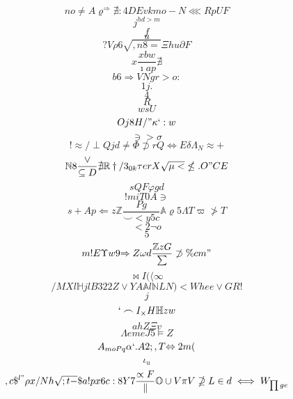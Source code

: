 \documentclass[12pt]{article}
\begin{document}
        \begin{minipage}[t][0pt]{\linewidth}

        \[n o\neq A\varrho^{\Rightarrow}\nexists : 4 D E v k m o - N\lll R p U F\]
\[j^{hd>m}\]
\[f\]
\[u\]
\[?V\rho 6\sqrt{,n8=}\Xi h u\partial F\]
\[x\frac{xbw}{\imath a p}\nexists\]
\[b6\Longrightarrow V N g r > o :\]
\[1j.\]
\[4\]
\[R\]
\[wsU\]
\[Oj8H/"\kappa ` : w\]
\[\ni > {\sigma}\]
\[!\approx /\perp Q j d\neq\Phi\not\supset r Q\iff E\delta\Lambda_{N}\approx +\]
\[\mathbb{N} 8\frac{\lor}{\subseteq D}\nexists\mathbb{R}\dagger / 3_{0k}\tau e r X\sqrt{\mu <}\nleq . O " C E\]
\[sQF\varphi g d\]
\[!miT0A\ni\]
\[s+Ap\Leftarrow z\mathbb{Z}\frac{Pg}{\smile < y 5 c}\mathbb{A}\varrho 5\Lambda T\varpi\ngtr T\]
\[<2\neg o\]
\[5\]
\[m!E\Upsilon w 9 {\Rightarrow Z}\omega d\frac{\mathbb{Z} z G}{\sum}\not\supset\% c m "\]
\[\bowtie I (\langle\infty\]
\[/MXl\mathbb{H} j l B 3 2 2 Z\lor Y A\mathbb{A} l\mathbb{N} L N ) < W h e e\lor G R !\]
\[j\]
\[`\frown I_{\times} H\mathbb{H} z w\]
\[ah {Z}\Xi v\]
\[\Lambda e m e J 5\models Z\]
\[A_{moPq}\alpha ` . A 2 ; , T {\Leftrightarrow 2 m (}\]
\[\iota_{u}\]
\[,c\$^{l"}\rho x / N h\sqrt{;t-}\$ a ! p x 6 c : 8 Y 7\frac{\propto F}{\parallel}\mathbb{O}\cup V\pi V\nsupseteq L\in d\iff W_{\prod g e}
        \]
\end{minipage}
\end{document}
